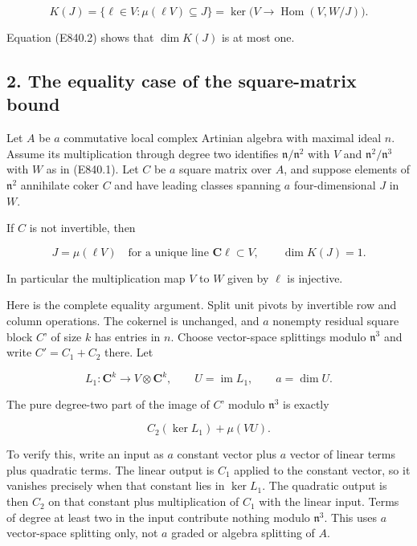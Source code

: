 \[
 K(J)=\{\ell\in V:\mu(\ell V)\subseteq J\}
      =\ker\bigl(V\longrightarrow\operatorname{Hom}(V,W/J)\bigr).
 \tag{E840.3}
\]

Equation (E840.2) shows that \(\dim K(J)\) is at most one.

\subsection{2. The equality case of the square-matrix
bound}\label{SF-E840:the-equality-case-of-the-square-matrix-bound}

Let \(A\) be \(a\) commutative local complex Artinian algebra with
maximal ideal \(n\). Assume its multiplication through degree two
identifies \(\mathfrak n/\mathfrak n^2\) with \(V\) and
\(\mathfrak n^2/\mathfrak n^3\) with \(W\) as in (E840.1). Let \(C\) be
\(a\) square matrix over \(A\), and suppose elements of
\(\mathfrak n^2\) annihilate coker \(C\) and have leading classes
spanning \(a\) four-dimensional \(J\) in \(W\).

If \(C\) is not invertible, then

\[
                   J=\mu(\ell V)
       \quad\text{for a unique line }\mathbf C\ell\subset V,
       \qquad \dim K(J)=1.
 \tag{E840.4}
\]

In particular the multiplication map \(V\) to \(W\) given by \(\ell\) is
injective.

Here is the complete equality argument. Split unit pivots by invertible
row and column operations. The cokernel is unchanged, and \(a\) nonempty
residual square block \(C\)' of size \(k\) has entries in \(n\). Choose
vector-space splittings modulo \(\mathfrak n^3\) and write
\(C'=C_1+C_2\) there. Let

\[
 L_1:\mathbf C^k\longrightarrow V\otimes\mathbf C^k,
 \qquad U=\operatorname{im}L_1,\qquad a=\dim U.
 \tag{E840.5}
\]

The pure degree-two part of the image of \(C\)' modulo \(\mathfrak n^3\)
is exactly

\[
             C_2(\ker L_1)+\mu(VU).
 \tag{E840.6}
\]

To verify this, write an input as \(a\) constant vector plus \(a\)
vector of linear terms plus quadratic terms. The linear output is
\(C_1\) applied to the constant vector, so it vanishes precisely when
that constant lies in \(\ker L_1\). The quadratic output is then \(C_2\)
on that constant plus multiplication of \(C_1\) with the linear input.
Terms of degree at least two in the input contribute nothing modulo
\(\mathfrak n^3\). This uses \(a\) vector-space splitting only, not
\(a\) graded or algebra splitting of \(A\).


